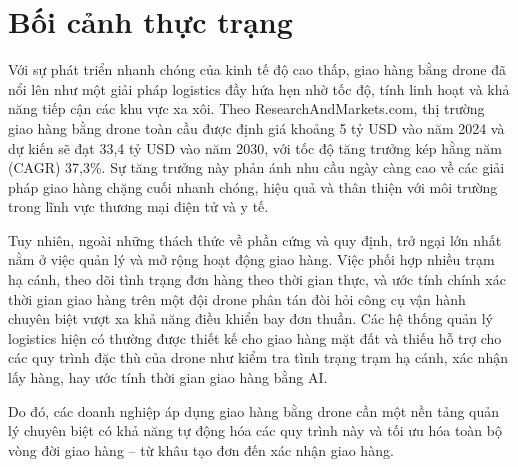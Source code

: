 \section{Bối cảnh thực trạng}

Với sự phát triển nhanh chóng của kinh tế độ cao thấp, giao hàng bằng drone đã nổi lên như một giải pháp logistics đầy hứa hẹn nhờ tốc độ, tính linh hoạt và khả năng tiếp cận các khu vực xa xôi. Theo ResearchAndMarkets.com, thị trường giao hàng bằng drone toàn cầu được định giá khoảng 5 tỷ USD vào năm 2024 và dự kiến sẽ đạt 33,4 tỷ USD vào năm 2030, với tốc độ tăng trưởng kép hằng năm (CAGR) 37,3\%. Sự tăng trưởng này phản ánh nhu cầu ngày càng cao về các giải pháp giao hàng chặng cuối nhanh chóng, hiệu quả và thân thiện với môi trường trong lĩnh vực thương mại điện tử và y tế.

Tuy nhiên, ngoài những thách thức về phần cứng và quy định, trở ngại lớn nhất nằm ở việc quản lý và mở rộng hoạt động giao hàng. Việc phối hợp nhiều trạm hạ cánh, theo dõi tình trạng đơn hàng theo thời gian thực, và ước tính chính xác thời gian giao hàng trên một đội drone phân tán đòi hỏi công cụ vận hành chuyên biệt vượt xa khả năng điều khiển bay đơn thuần. Các hệ thống quản lý logistics hiện có thường được thiết kế cho giao hàng mặt đất và thiếu hỗ trợ cho các quy trình đặc thù của drone như kiểm tra tình trạng trạm hạ cánh, xác nhận lấy hàng, hay ước tính thời gian giao hàng bằng AI.

Do đó, các doanh nghiệp áp dụng giao hàng bằng drone cần một nền tảng quản lý chuyên biệt có khả năng tự động hóa các quy trình này và tối ưu hóa toàn bộ vòng đời giao hàng -- từ khâu tạo đơn đến xác nhận giao hàng.

